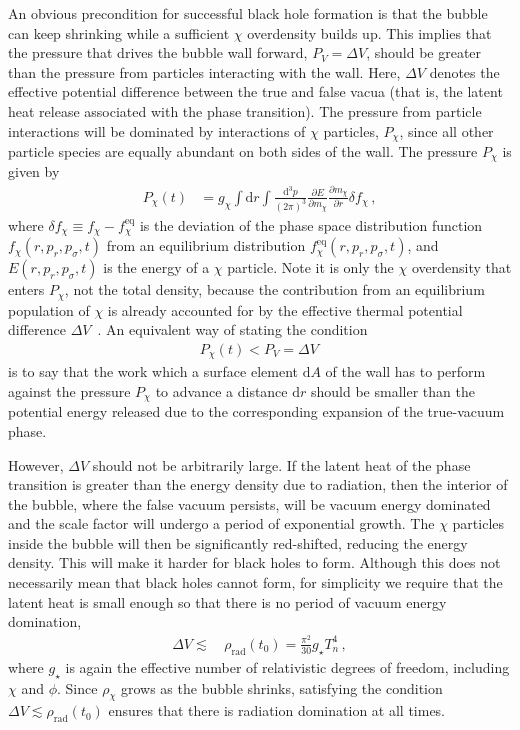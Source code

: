 \documentclass[
onecolumn, %
11pt, %
tightenlines,
superscriptaddress, %
nofootinbib, %
preprintnumbers, %
prd %
]{revtex4-1}
\newcommand{\pd}[2]{\frac{\partial #1}{\partial #2}}                  %
\newcommand{\upd}{\mathrm d}                                          %
\newcommand{\f}{\ensuremath{f_\chi}\xspace}
\begin{document}
An obvious precondition for successful black hole formation is that the bubble can keep shrinking while a sufficient $\chi$ overdensity builds up.  This implies that the pressure that drives the bubble wall forward, $P_V = \Delta V$, should be greater than the pressure from particles interacting with the wall. Here, $\Delta V$ denotes the effective potential difference between the true and false vacua (that is, the latent heat release associated with the phase transition). The pressure from particle interactions will be dominated by interactions of $\chi$ particles, $P_\chi$, since all other particle species are equally abundant on both sides of the wall.  The pressure $P_\chi$ is given by~\cite{Megevand:2009gh,Moore:1995si}
%
\begin{align}
    P_\chi(t) &= g_\chi \int\!\upd r \int\!\frac{\upd^3p}{(2\pi)^3}
                 \pd{E}{m_\chi} \pd{m_\chi}{r} \delta \f \,,
    \label{eq:pressure}
\end{align}
%
where $\delta f_\chi \equiv f_\chi - f_\chi^\text{eq}$ is the deviation of the phase space distribution function $f_\chi(r, p_r, p_\sigma, t)$ from an equilibrium distribution $f_\chi^\text{eq}(r, p_r, p_\sigma, t)$, and $E(r, p_r, p_\sigma, t)$ is the energy of a $\chi$ particle. Note it is only the $\chi$ overdensity that enters $P_\chi$, not the total density, because the contribution from an equilibrium population of $\chi$ is already accounted for by the effective thermal potential difference $\Delta V$~\cite{Moore:1995ua}. An equivalent way of stating the condition
%
\begin{align}
    P_\chi(t) < P_V = \Delta V \,
    \label{eq:pressure-cond}
\end{align}
%
is to say that the work which a surface element $\upd A$ of the wall has to perform against the pressure $P_\chi$ to advance a distance $\upd r$ should be smaller than the potential energy released due to the corresponding expansion of the true-vacuum phase.

However, $\Delta V$ should not be arbitrarily large. If the latent heat of the phase transition is greater than the energy density due to radiation, then the interior of the bubble, where the false vacuum persists, will be vacuum energy dominated and the scale factor will undergo a period of exponential growth.  The $\chi$ particles inside the bubble will then be significantly red-shifted, reducing the energy density.  This will make it harder for black holes to form.  Although this does not necessarily mean that black holes cannot form, for simplicity we require that the latent heat is small enough so that there is no period of vacuum energy domination,
%
\begin{align}
    \Delta V \lesssim &\, \rho_\text{rad}(t_0) = \frac{\pi^2}{30} g_\star T_n^4 \,,
        \label{eq:DV-condition}
\end{align}
%
where $g_\star$ is again the effective number of relativistic degrees of freedom, including $\chi$ and $\phi$.  Since $\rho_\chi$ grows as the bubble shrinks, satisfying the condition $\Delta V \lesssim \rho_\text{rad}(t_0)$ ensures that there is radiation domination at all times.
\end{document}
